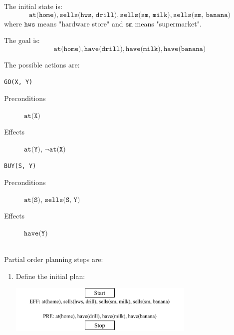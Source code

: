 \begin{example}
    The initial state is: 
    \[ \texttt{at(home)}, \texttt{sells(hws, drill)}, \texttt{sells(sm, milk)}, \texttt{sells(sm, banana)} \]
    where $\texttt{hws}$ means "hardware store" and $\texttt{sm}$ means "supermarket".
    
    The goal is:
    \[ \texttt{at(home)}, \texttt{have(drill)}, \texttt{have(milk)}, \texttt{have(banana)} \]

    The possible actions are:\\[0.5em]
    \begin{minipage}{.5\linewidth}
        \begin{descriptionlist}
            \item[\texttt{GO(X, Y)}] \phantom{}
                \begin{description}
                    \item[Preconditions] $\texttt{at(X)}$
                    \item[Effects] $\texttt{at(Y)}$, $\lnot \texttt{at(X)}$
                \end{description}
        \end{descriptionlist}
    \end{minipage}
    \begin{minipage}{.5\linewidth}
        \begin{descriptionlist}
            \item[\texttt{BUY(S, Y)}] \phantom{}
            \begin{description}
                \item[Preconditions] $\texttt{at(S)}$, $\texttt{sells(S, Y)}$
                \item[Effects] $\texttt{have(Y)}$
            \end{description}
        \end{descriptionlist}
    \end{minipage}\\[0.5em]

    Partial order planning steps are:
    \begin{enumerate}
        \item Define the initial plan:
            \begin{center}
                \includegraphics[width=0.7\textwidth]{img/_pop_example1.pdf}
            \end{center}


\end{enumerate}
\end{example}
